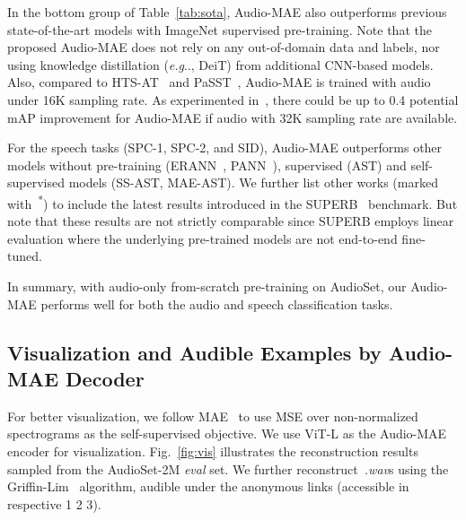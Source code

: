 \documentclass{article}
\makeatletter
\DeclareRobustCommand\onedot{\futurelet\@let@token\@onedot}
\def\@onedot{\ifx\@let@token.\else.\null\fi\xspace}
\def\eg{\emph{e.g}\onedot} \def\Eg{\emph{E.g}\onedot}
\makeatother
\begin{document}
In the bottom group of Table~\ref{tab:sota}, Audio-MAE also outperforms previous state-of-the-art models with ImageNet supervised pre-training. 
Note that the proposed Audio-MAE does not rely on any out-of-domain data and labels, nor using knowledge distillation (\eg, DeiT) from additional CNN-based models. 
Also, compared to HTS-AT~\cite{chen2022hts} and PaSST~\cite{paast}, Audio-MAE is trained with audio under 16K sampling rate. As experimented in~\cite{kong2019panns}, there could be up to 0.4 potential mAP improvement for Audio-MAE if audio with 32K sampling rate are available.


For the speech tasks (SPC-1, SPC-2, and SID), Audio-MAE  outperforms other models without pre-training (ERANN~\cite{verbitskiy2021eranns}, PANN~\cite{kong2019panns}), supervised (AST) and self-supervised models (SS-AST, MAE-AST).
We further list other works (marked with~\textsuperscript{*}) to include the latest results introduced in the SUPERB~\cite{yang21c_interspeech} benchmark. But note that these results are not strictly comparable since SUPERB employs linear evaluation where the underlying pre-trained models are not end-to-end fine-tuned.

In summary, with audio-only from-scratch pre-training on AudioSet, our Audio-MAE performs well for both the audio and speech classification tasks.







\subsection{Visualization and Audible Examples by Audio-MAE Decoder}


For better visualization, we follow MAE~\cite{mae} to use MSE over non-normalized spectrograms as the self-supervised objective. We use ViT-L as the Audio-MAE encoder for visualization.
Fig.~\ref{fig:vis} illustrates the reconstruction results sampled from the AudioSet-2M \textit{eval} set.
We further reconstruct~\emph{.wav}s using the Griffin-Lim~\cite{griffin_lim} algorithm, audible under the anonymous links (accessible in respective {\color{hrefcolor} 1 2 3}).
\end{document}

